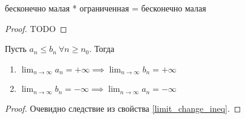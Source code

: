 \begin{theorem}

    бесконечно малая * ограниченная = бесконечно малая
\end{theorem}
\begin{proof}
    TODO
\end{proof}

\begin{theorem}
    Пусть $ a_n \leq  b_n \ \forall n \geq n_0$. Тогда \begin{enumerate}
        \item $ \lim_{n \to  \infty} a_n = +\infty \implies \lim_{n \to \infty} b_n = + \infty $
        \item $ \lim_{n \to  \infty} b_n = -\infty \implies  \lim_{n \to \infty}a_n = - \infty$
    \end{enumerate}
\end{theorem}
\begin{proof}
    Очевидно следствие из свойства \ref{limit_change_ineq}.
\end{proof}
